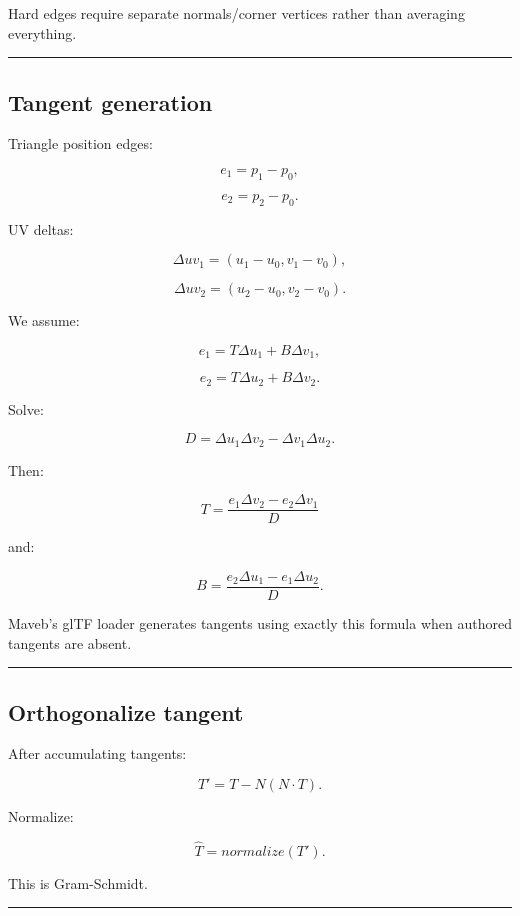Hard edges require separate normals/corner vertices rather than averaging everything.

\begin{center}\rule{0.5\linewidth}{0.5pt}\end{center}

\subsection{Tangent generation}\label{04-visual-computing-ii-ch041-tangent-generation}

Triangle position edges:

\[
e_1=p_1-p_0,
\]

\[
e_2=p_2-p_0.
\]

UV deltas:

\[
\Delta uv_1=
(u_1-u_0,v_1-v_0),
\]

\[
\Delta uv_2=
(u_2-u_0,v_2-v_0).
\]

We assume:

\[
e_1=
T\Delta u_1+
B\Delta v_1,
\]

\[
e_2=
T\Delta u_2+
B\Delta v_2.
\]

Solve:

\[
D=
\Delta u_1\Delta v_2
-
\Delta v_1\Delta u_2.
\]

Then:

\[
\boxed{
T=
\frac{
e_1\Delta v_2-
e_2\Delta v_1
}{D}
}
\]

and:

\[
\boxed{
B=
\frac{
e_2\Delta u_1-
e_1\Delta u_2
}{D}.
}
\]

Maveb's glTF loader generates tangents using exactly this formula when authored tangents are absent.

\begin{center}\rule{0.5\linewidth}{0.5pt}\end{center}

\subsection{Orthogonalize tangent}\label{04-visual-computing-ii-ch041-orthogonalize-tangent}

After accumulating tangents:

\[
T'
=
T-N(N\cdot T).
\]

Normalize:

\[
\boxed{
\hat T=
normalize(T').
}
\]

This is Gram-Schmidt.

\begin{center}\rule{0.5\linewidth}{0.5pt}\end{center}

